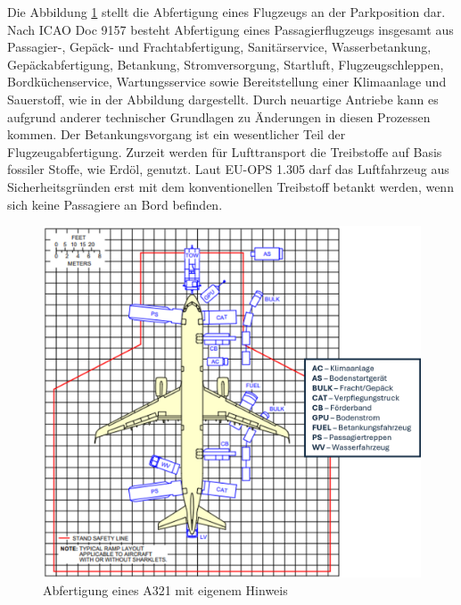 Die Abbildung \ref{abfertigung} stellt die Abfertigung eines Flugzeugs an der Parkposition dar.
Nach ICAO Doc 9157 besteht Abfertigung eines Passagierflugzeugs 
insgesamt aus Passagier-, Gepäck- und Frachtabfertigung, Sanitärservice, Wasserbetankung, 
Gepäckabfertigung, Betankung, Stromversorgung, Startluft, Flugzeugschleppen, 
Bordküchenservice, Wartungsservice sowie Bereitstellung einer Klimaanlage und Sauerstoff,
wie in der Abbildung dargestellt. Durch neuartige Antriebe kann es aufgrund anderer 
technischer Grundlagen zu Änderungen in diesen Prozessen kommen.
%
Der Betankungsvorgang ist ein wesentlicher Teil der Flugzeugabfertigung. 
Zurzeit werden für Lufttransport die Treibstoffe auf Basis fossiler Stoffe, wie Erdöl, genutzt. 
Laut EU-OPS 1.305 darf das Luftfahrzeug aus Sicherheitsgründen erst mit dem konventionellen Treibstoff betankt werden, 
wenn sich keine Passagiere an Bord befinden. 
%
%
\begin{figure}[h]
	\centering
	\includegraphics[width=0.8\linewidth]{Bilder/A321_Abfertigung.png}
	\caption[Abfertigung eines Flugzeugs an der Parkposition]{Abfertigung eines A321 \cite{airbus2022a321} mit eigenem Hinweis}
	\label{abfertigung}
\end{figure}
